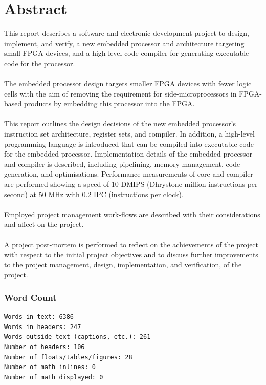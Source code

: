 \documentclass[11pt,a4paper]{report}
\begin{document}
\chapter*{Abstract}
\startcontents[chapters]
\noindent
This report describes a software and electronic development project to design, implement, and verify, a new embedded processor and architecture targeting small FPGA devices, and a high-level code compiler for generating executable code for the processor.
\\\\
The embedded processor design targets smaller FPGA devices with fewer logic cells with the aim of removing the requirement for side-microprocessors in FPGA-based products by embedding this processor into the FPGA.
\\\\
This report outlines the design decisions of the new embedded processor's instruction set architecture, register sets, and compiler. In addition, a high-level programming language is introduced that can be compiled into executable code for the embedded processor. Implementation details of the embedded processor and compiler is described, including pipelining, memory-management, code-generation, and optimisations. Performance measurements of core and compiler are performed showing a speed of 10 DMIPS (Dhrystone million instructions per second) at 50 MHz with 0.2 IPC (instructions per clock).
\\\\
Employed project management work-flows are described with their considerations and affect on the project. 
\\\\
A project post-mortem is performed to reflect on the achievements of the project with respect to the initial project objectives and to discuss further improvements to the project management, design, implementation, and verification, of the project.

\newpage
\renewcommand*\contentsname{Table of Contents}

{\hypersetup{linkcolor=black}
\tableofcontents
\listoffigures
\listoftables}
\newpage
 
\subsection*{Word Count}
\begin{verbatim}
Words in text: 6386
Words in headers: 247
Words outside text (captions, etc.): 261
Number of headers: 106
Number of floats/tables/figures: 28
Number of math inlines: 0
Number of math displayed: 0
\end{verbatim}
\end{document}
